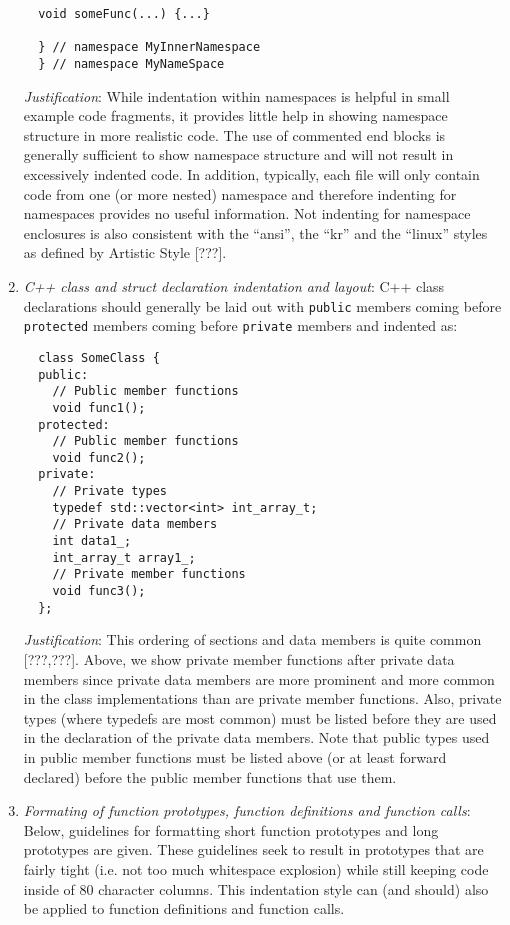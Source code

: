 \begin{enumerate}
{\begin{verbatim}
  void someFunc(...) {...}

  } // namespace MyInnerNamespace
  } // namespace MyNameSpace
\end{verbatim}}

{}\textit{Justification}: While indentation within namespaces is
helpful in small example code fragments, it provides little help in
showing namespace structure in more realistic code.  The use of
commented end blocks is generally sufficient to show namespace
structure and will not result in excessively indented code.  In
addition, typically, each file will only contain code from one (or
more nested) namespace and therefore indenting for namespaces provides
no useful information.  Not indenting for namespace enclosures is also
consistent with the ``ansi'', the ``kr'' and the ``linux'' styles as
defined by Artistic Style [???].

{}\item\textit{C++ class and struct declaration indentation and layout}: C++
class declarations should generally be laid out with {}\texttt{public}
members coming before {}\texttt{protected} members coming before
{}\texttt{private} members and indented as:

{\small\begin{verbatim}
  class SomeClass {
  public:
    // Public member functions
    void func1();
  protected:
    // Public member functions
    void func2();
  private:
    // Private types
    typedef std::vector<int> int_array_t;
    // Private data members
    int data1_;
    int_array_t array1_;
    // Private member functions
    void func3();
  };
\end{verbatim}}

{}\textit{Justification}: This ordering of sections and data members is quite
common [???,???].  Above, we show private member functions after private data
members since private data members are more prominent and more common in the
class implementations than are private member functions.  Also, private types
(where typedefs are most common) must be listed before they are used in the
declaration of the private data members.  Note that public types used in
public member functions must be listed above (or at least forward declared)
before the public member functions that use them.

{}\item\textit{Formating of function prototypes, function definitions and
function calls}: Below, guidelines for formatting short function prototypes
and long prototypes are given.  These guidelines seek to result in prototypes
that are fairly tight (i.e. not too much whitespace explosion) while still
keeping code inside of 80 character columns.  This indentation style can (and
should) also be applied to function definitions and function calls.


\end{enumerate}
